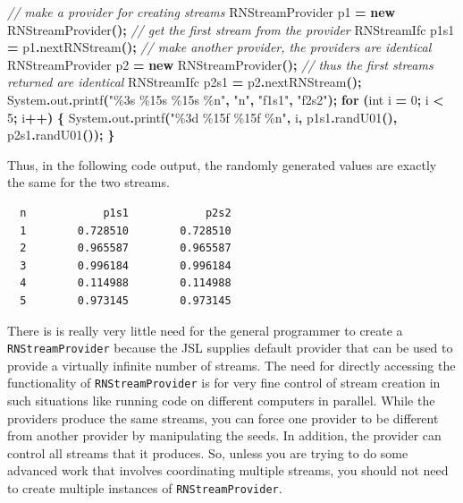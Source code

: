 \documentclass[
]{book}
\newenvironment{Shaded}{\begin{snugshade}}{\end{snugshade}}
\newcommand{\BuiltInTok}[1]{#1}
\newcommand{\CommentTok}[1]{\textcolor[rgb]{0.56,0.35,0.01}{\textit{#1}}}
\newcommand{\ControlFlowTok}[1]{\textcolor[rgb]{0.13,0.29,0.53}{\textbf{#1}}}
\newcommand{\DataTypeTok}[1]{\textcolor[rgb]{0.13,0.29,0.53}{#1}}
\newcommand{\DecValTok}[1]{\textcolor[rgb]{0.00,0.00,0.81}{#1}}
\newcommand{\FunctionTok}[1]{\textcolor[rgb]{0.00,0.00,0.00}{#1}}
\newcommand{\KeywordTok}[1]{\textcolor[rgb]{0.13,0.29,0.53}{\textbf{#1}}}
\newcommand{\NormalTok}[1]{#1}
\newcommand{\OperatorTok}[1]{\textcolor[rgb]{0.81,0.36,0.00}{\textbf{#1}}}
\newcommand{\SpecialCharTok}[1]{\textcolor[rgb]{0.00,0.00,0.00}{#1}}
\newcommand{\StringTok}[1]{\textcolor[rgb]{0.31,0.60,0.02}{#1}}
\theoremstyle{definition}
\theoremstyle{definition}
\theoremstyle{definition}
\theoremstyle{definition}
\theoremstyle{remark}
\begin{document}
\begin{Shaded}
\begin{Highlighting}[]
\CommentTok{// make a provider for creating streams}
\NormalTok{RNStreamProvider p1 }\OperatorTok{=} \KeywordTok{new} \FunctionTok{RNStreamProvider}\OperatorTok{();}
\CommentTok{// get the first stream from the provider}
\NormalTok{RNStreamIfc p1s1 }\OperatorTok{=}\NormalTok{ p1}\OperatorTok{.}\FunctionTok{nextRNStream}\OperatorTok{();}
\CommentTok{// make another provider, the providers are identical}
\NormalTok{RNStreamProvider p2 }\OperatorTok{=} \KeywordTok{new} \FunctionTok{RNStreamProvider}\OperatorTok{();}
\CommentTok{// thus the first streams returned are identical}
\NormalTok{RNStreamIfc p2s1 }\OperatorTok{=}\NormalTok{ p2}\OperatorTok{.}\FunctionTok{nextRNStream}\OperatorTok{();}
\BuiltInTok{System}\OperatorTok{.}\FunctionTok{out}\OperatorTok{.}\FunctionTok{printf}\OperatorTok{(}\StringTok{"}\SpecialCharTok{\%3s}\StringTok{ }\SpecialCharTok{\%15s}\StringTok{ }\SpecialCharTok{\%15s}\StringTok{ }\SpecialCharTok{\%n}\StringTok{"}\OperatorTok{,} \StringTok{"n"}\OperatorTok{,} \StringTok{"f1s1"}\OperatorTok{,} \StringTok{"f2s2"}\OperatorTok{);}
\ControlFlowTok{for} \OperatorTok{(}\DataTypeTok{int}\NormalTok{ i }\OperatorTok{=} \DecValTok{0}\OperatorTok{;}\NormalTok{ i }\OperatorTok{\textless{}} \DecValTok{5}\OperatorTok{;}\NormalTok{ i}\OperatorTok{++)} \OperatorTok{\{}
    \BuiltInTok{System}\OperatorTok{.}\FunctionTok{out}\OperatorTok{.}\FunctionTok{printf}\OperatorTok{(}\StringTok{"}\SpecialCharTok{\%3d}\StringTok{ }\SpecialCharTok{\%15f}\StringTok{ }\SpecialCharTok{\%15f}\StringTok{ }\SpecialCharTok{\%n}\StringTok{"}\OperatorTok{,}\NormalTok{ i}\OperatorTok{,}\NormalTok{ p1s1}\OperatorTok{.}\FunctionTok{randU01}\OperatorTok{(),}\NormalTok{ p2s1}\OperatorTok{.}\FunctionTok{randU01}\OperatorTok{());}
\OperatorTok{\}}
\end{Highlighting}
\end{Shaded}

Thus, in the following code output, the randomly generated values are exactly the same for the two streams.

\begin{verbatim}
  n            p1s1            p2s2 
  1        0.728510        0.728510 
  2        0.965587        0.965587 
  3        0.996184        0.996184 
  4        0.114988        0.114988 
  5        0.973145        0.973145 
\end{verbatim}

There is is really very little need for the general programmer to create
a \texttt{RNStreamProvider} because the JSL supplies default provider that can be used to provide a
virtually infinite number of streams. The need for directly accessing the functionality of \texttt{RNStreamProvider} is
for very fine control of stream creation in such situations like running
code on different computers in parallel. While the providers produce the
same streams, you can force one provider to be different from another
provider by manipulating the seeds. In addition, the
provider can control all streams that it produces. So, unless you are
trying to do some advanced work that involves coordinating multiple streams, you should not need to create multiple instances of \texttt{RNStreamProvider}.
\end{document}
